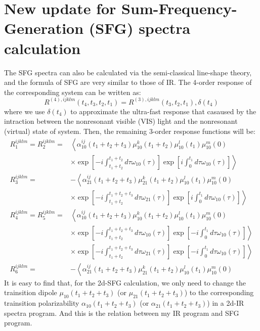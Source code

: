 \documentclass[12pt,a4paper,scale=1.0]{article}
\begin{document}
	\section{New update for Sum-Frequency-Generation (SFG) spectra calculation}
	The SFG spectra can also be calculated via the semi-classical line-shape theory, and the formula of SFG are very similar to those of IR. 
	The 4-order response of the corresponding system can be written as\cite{Kraack2017}:
	\begin{equation}
		R^{(4), i j k l m}\left(t_4, t_3, t_2, t_1\right)=R^{(3), i j k l m}\left(t_3, t_2, t_1\right) , \delta\left(t_4\right)
	\end{equation}
	where we use $\delta (t_4)$ to approximate the ultra-fast
	response that casaused by the intraction between the nonresonant visible (VIS) light  and the nonresonant (virtual) state of system. 
	Then, the remaining 3-order response functions will be:
	\begin{equation}
		\begin{aligned}
			R_1^{i j k l m}=R_2^{i j k l m}= & \left\langle\alpha_{10}^{i j}\left(t_1+t_2+t_3\right) \mu_{10}^k\left(t_1+t_2\right) \mu_{10}^l\left(t_1\right) \mu_{10}^m(0)\right. \\
			& \left.\times \exp \left[-i \int_{t_1+t_2}^{t_1+t_2} d \tau \omega_{10}(\tau)\right] \exp \left[i \int_0^{t_1} d \tau \omega_{10}(\tau)\right]\right\rangle \\
			R_3^{i j k l m}= & -\left\langle\alpha_{21}^{i j}\left(t_1+t_2+t_3\right) \mu_{21}^k\left(t_1+t_2\right) \mu_{10}^l\left(t_1\right) \mu_{10}^m(0)\right. \\
			& \left.\times \exp \left[-i \int_{t_1+t_2}^{t_1+t_2+t_3} d \tau \omega_{21}(\tau)\right] \exp \left[i \int_0^{t_1} d \tau \omega_{10}(\tau)\right]\right\rangle \\
			R_4^{i j k l m}=R_5^{i j k l m}= & \left\langle\alpha_{10}^{i j}\left(t_1+t_2+t_3\right) \mu_{10}^k\left(t_1+t_2\right) \mu_{10}^l\left(t_1\right) \mu_{10}^m(0)\right. \\
			& \left.\times \exp \left[-i \int_{t_1+t_2}^{t_1+t_2+t_3} d \tau \omega_{10}(\tau)\right] \exp \left[-i \int_0^{t_1} d \tau \omega_{10}(\tau)\right]\right\rangle \\
			& \left.\times \exp \left[-i \int_{t_1+t_2}^{t_1+t_2+t_3} d \tau \omega_{21}(\tau)\right] \exp \left[-i \int_0^{t_1} d \tau \omega_{10}(\tau)\right]\right\rangle \\
			R_6^{i j k l m}= & -\left\langle\alpha_{21}^{i j}\left(t_1+t_2+t_3\right) \mu_{21}^k\left(t_1+t_2\right) \mu_{10}^l\left(t_1\right) \mu_{10}^m(0)\right.
		\end{aligned}
	\end{equation}
	It is easy to find that, for the 2d-SFG calculation, we only need to change the trainsition dipole $\mu_{10}(t_1 +t_2 + t_3)$ (or $\mu_{21}(t_1 +t_2 + t_3)$)  to the corresponding trainsition polarizability $\alpha_{10}(t_1 +t_2 + t_3)$ (or $\alpha_{21}(t_1 +t_2 + t_3)$)  in a 2d-IR spectra program.
	And this is the relation between my IR program and SFG program.
 	
	
	

	
\end{document}
